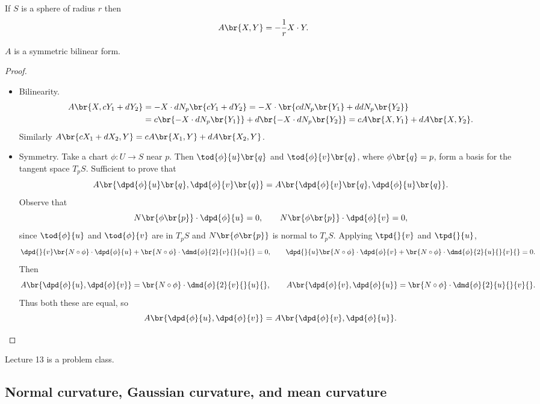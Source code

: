 \begin{example*}
If $ S $ is a sphere of radius $ r $ then
$$ A\br{X, Y} = -\dfrac{1}{r}X \cdot Y. $$
\end{example*}

\begin{proposition}
$ A $ is a symmetric bilinear form.
\end{proposition}

\begin{proof}
\hfill
\begin{itemize}
\item Bilinearity.
\begin{align*}
A\br{X, cY_1 + dY_2}
& = -X \cdot dN_p\br{cY_1 + dY_2}
= -X \cdot \br{cdN_p\br{Y_1} + ddN_p\br{Y_2}} \\
& = c\br{-X \cdot dN_p\br{Y_1}} + d\br{-X \cdot dN_p\br{Y_2}}
= cA\br{X, Y_1} + dA\br{X, Y_2}.
\end{align*}
Similarly $ A\br{cX_1 + dX_2, Y} = cA\br{X_1, Y} + dA\br{X_2, Y} $.
\item Symmetry. Take a chart $ \phi : U \to S $ near $ p $. Then $ \tod{\phi}{u}\br{q} $ and $ \tod{\phi}{v}\br{q} $, where $ \phi\br{q} = p $, form a basis for the tangent space $ T_pS $. Sufficient to prove that
$$ A\br{\dpd{\phi}{u}\br{q}, \dpd{\phi}{v}\br{q}} = A\br{\dpd{\phi}{v}\br{q}, \dpd{\phi}{u}\br{q}}. $$
Observe that
$$ N\br{\phi\br{p}} \cdot \dpd{\phi}{u} = 0, \qquad N\br{\phi\br{p}} \cdot \dpd{\phi}{v} = 0, $$
since $ \tod{\phi}{u} $ and $ \tod{\phi}{v} $ are in $ T_pS $ and $ N\br{\phi\br{p}} $ is normal to $ T_pS $. Applying $ \tpd{}{v} $ and $ \tpd{}{u} $,
$$ \dpd{}{v}\br{N \circ \phi} \cdot \dpd{\phi}{u} + \br{N \circ \phi} \cdot \dmd{\phi}{2}{v}{}{u}{} = 0, \qquad \dpd{}{u}\br{N \circ \phi} \cdot \dpd{\phi}{v} + \br{N \circ \phi} \cdot \dmd{\phi}{2}{u}{}{v}{} = 0. $$
Then
$$ A\br{\dpd{\phi}{u}, \dpd{\phi}{v}} = \br{N \circ \phi} \cdot \dmd{\phi}{2}{v}{}{u}{}, \qquad A\br{\dpd{\phi}{v}, \dpd{\phi}{u}} = \br{N \circ \phi} \cdot \dmd{\phi}{2}{u}{}{v}{}. $$
Thus both these are equal, so
$$ A\br{\dpd{\phi}{u}, \dpd{\phi}{v}} = A\br{\dpd{\phi}{v}, \dpd{\phi}{u}}. $$
\end{itemize}
\end{proof}


Lecture 13 is a problem class.

\pagebreak

\subsection{Normal curvature, Gaussian curvature, and mean curvature}

